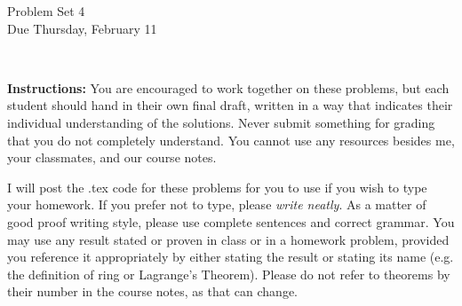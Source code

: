 \documentclass[11pt]{article}
\title{}
\date{\vspace{-0.5in}}
\theoremstyle{definition}
\begin{document}
\thispagestyle{fancy}
\pagestyle{fancy}

\vspace{3em}

\begin{center}
	{\LARGE Problem Set 4 \\}
	Due Thursday, February 11
\end{center}

\

\noindent
{\bf Instructions:}
You are encouraged to work together on these problems, but each student should hand in their own final draft, written in a way that indicates their individual understanding of the solutions. Never submit something for grading that you do not completely understand. You cannot use any resources besides me, your classmates, and our course notes.


I will post the .tex code for these problems for you to use if you wish to type your homework. If you prefer not to type, please  {\em write neatly}. As a matter of good proof writing style, please use complete sentences and correct grammar. You may use any result stated or proven in class or in a homework problem, provided you reference it appropriately by either stating the result or stating its name (e.g. the definition of ring or Lagrange's Theorem). Please do not refer to theorems by their number in the course notes, as that can change.


\smallskip
\end{document}
